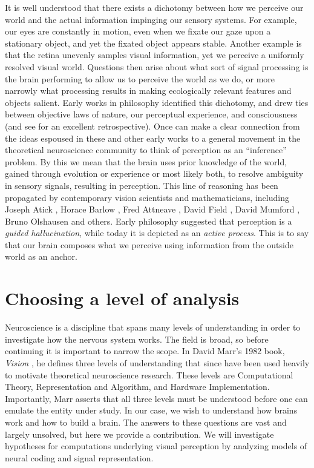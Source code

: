 It is well understood that there exists a dichotomy between how we perceive our world and the actual information impinging our sensory systems. For example, our eyes are constantly in motion, even when we fixate our gaze upon a stationary object, and yet the fixated object appears stable. Another example is that the retina unevenly samples visual information, yet we perceive a uniformly resolved visual world. Questions then arise about what sort of signal processing is the brain performing to allow us to perceive the world as we do, or more narrowly what processing results in making ecologically relevant features and objects salient. Early works in philosophy identified this dichotomy, and drew ties between objective laws of nature, our perceptual experience, and consciousness \parencite{kant1790critique, helmholtz1878facts} (and see \parencite{westheimer2008helmholtz} for an excellent retrospective). Once can make a clear connection from the ideas espoused in these and other early works to a general movement in the theoretical neuroscience community to think of perception as an ``inference'' problem. By this we mean that the brain uses prior knowledge of the world, gained through evolution or experience or most likely both, to resolve ambiguity in sensory signals, resulting in perception. This line of reasoning has been propagated by contemporary vision scientists and mathematicians, including Joseph Atick \citeyearpar{atick1990towards}, Horace Barlow \citeyearpar{barlow2001redundancy}, Fred Attneave \citeyearpar{attneave1954some}, David Field \citeyearpar{field1994goal}, David Mumford \citeyearpar{mumford1994pattern}, Bruno Olshausen \citeyearpar{olshausen2013perception} and others. Early philosophy suggested that perception is a \textit{guided hallucination}, while today it is depicted as an \textit{active process}. This is to say that our brain composes what we perceive using information from the outside world as an anchor.


\section{Choosing a level of analysis}
Neuroscience is a discipline that spans many levels of understanding in order to investigate how the nervous system works. The field is broad, so before continuing it is important to narrow the scope. In David Marr's 1982 book, \textit{Vision} \citeyearpar{marr1982vision}, he defines three levels of understanding that since have been used heavily to motivate theoretical neuroscience research. These levels are Computational Theory, Representation and Algorithm, and Hardware Implementation. Importantly, Marr asserts that all three levels must be understood before one can emulate the entity under study. In our case, we wish to understand how brains work and how to build a brain. The answers to these questions are vast and largely unsolved, but here we provide a contribution. We will investigate hypotheses for computations underlying visual perception by analyzing models of neural coding and signal representation.

